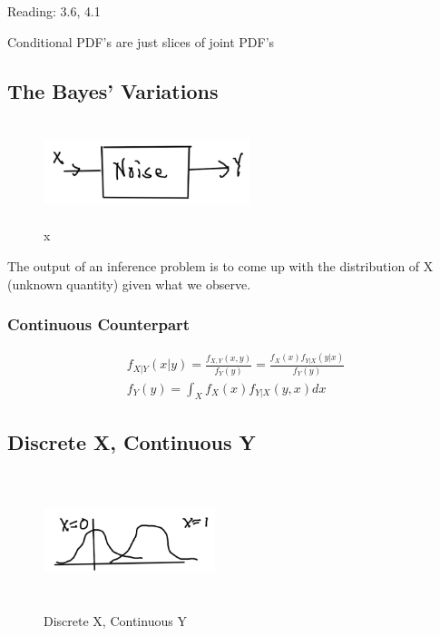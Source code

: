 

Reading: 3.6, 4.1

Conditional PDF's are just slices of joint PDF's

\subsection{The Bayes' Variations}


\begin{figure}[h]
\centering
\includegraphics[width=6cm, height=3cm]{images/L10/noise_model.jpeg}
\caption{x}
\end{figure}


The output of an inference problem is to come up with the distribution of X (unknown quantity) given what we observe.

\subsubsection{Continuous Counterpart}

\begin{align*}
f_{X|Y}(x|y) = \frac{f_{X,Y}(x,y)}{f_Y(y)}  = \frac{f_X(x) f_{Y|X}(y|x)}{f_Y(y)}\\
f_Y(y) = \int_X f_X(x) f_{Y|X}(y,x)dx
\end{align*}

\subsection{Discrete X, Continuous Y}


\begin{figure}[h]
\centering
\includegraphics[width=5cm, height=4cm]{images/L10/discrete_continuous.jpeg}
\caption{Discrete X, Continuous Y}
\end{figure}

